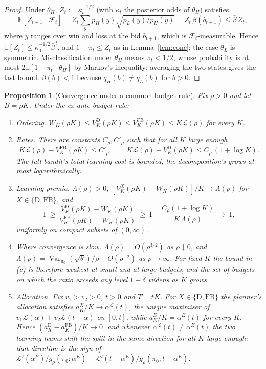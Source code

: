 \documentclass[11pt]{article}
\newtheorem{proposition}{Proposition}
\theoremstyle{definition}
\theoremstyle{remark}
\newcommand{\E}{\mathbb{E}}
\DeclareMathOperator{\Var}{Var}
\begin{document}
\begin{proof}
Under $\theta_H$, $Z_t:=\kappa_t^{-1/2}$ (with $\kappa_t$ the posterior odds of $\theta_H$) satisfies
\[
\E[Z_{t+1}\mid\mathcal F_t]=Z_t\sum_{y}p_H(y)\sqrt{p_L(y)/p_H(y)}=Z_t\,\beta(b_{t+1})\le\bar\beta\,Z_t,
\]
where $y$ ranges over win and loss at the bid $b_{t+1}$, which is $\mathcal F_t$-measurable. Hence $\E[Z_t]\le\kappa_0^{-1/2}\bar\beta^{\,t}$,
and $1-\pi_t\le Z_t$ as in Lemma~\ref{lem:conc}; the case $\theta_L$ is symmetric. Misclassification under $\theta_H$
means $\pi_t<1/2$, whose probability is at most $2\E[1-\pi_t\mid\theta_H]$ by Markov's inequality; averaging the two
states gives the last bound. $\beta(b)<1$ because $q_H(b)\neq q_L(b)$ for $b>0$.
\end{proof}

\begin{proposition}[Convergence under a common budget rule]\label{prop:common}
Fix $\rho>0$ and let $B=\rho K$. Under the ex-ante budget rule:
\begin{enumerate}
\item[(a)] \emph{Ordering.} $W_K(\rho K)\le V^{\mathrm D}_K(\rho K)\le V^{\mathrm{FB}}_K(\rho K)\le K\mathcal L(\rho)$ for every $K$.
\item[(b)] \emph{Rates.} There are constants $C_\rho,C'_\rho$ such that for all $K$ large enough
\[
K\mathcal L(\rho)-V^{\mathrm{FB}}_K(\rho K)\le C'_\rho,\qquad K\mathcal L(\rho)-V^{\mathrm D}_K(\rho K)\le C_\rho\,(1+\log K).
\]
The full bandit's total learning cost is bounded; the decomposition's grows at most logarithmically.
\item[(c)] \emph{Learning premia.} $\Lambda(\rho)>0$, $[V^{X}_K(\rho K)-W_K(\rho K)]/K\to\Lambda(\rho)$ for
$X\in\{\mathrm D,\mathrm{FB}\}$, and
\[
1\ \ge\ \frac{V^{\mathrm D}_K(\rho K)-W_K(\rho K)}{V^{\mathrm{FB}}_K(\rho K)-W_K(\rho K)}\ \ge\ 1-\frac{C_\rho(1+\log K)}{K\,\Lambda(\rho)}\ \to\ 1,
\]
uniformly on compact subsets of $(0,\infty)$.
\item[(d)] \emph{Where convergence is slow.} $\Lambda(\rho)=O(\rho^{3/2})$ as $\rho\downarrow0$, and
$\Lambda(\rho)=\Var_{\pi_0}(\sqrt\theta)/\rho+O(\rho^{-2})$ as $\rho\to\infty$. For fixed $K$ the bound in (c) is
therefore weakest at small and at large budgets, and the set of budgets on which the ratio exceeds any level
$1-\delta$ widens as $K$ grows.
\item[(e)] \emph{Allocation.} Fix $v_1>v_2>0$, $t>0$ and $T=tK$. For $X\in\{\mathrm D,\mathrm{FB}\}$ the planner's
allocation satisfies $a^X_K/K\to\alpha^{\mathcal L}(t)$, the unique maximiser of $v_1\mathcal L(\alpha)+v_2\mathcal L(t-\alpha)$
on $[0,t]$, while $a^E_K/K=\alpha^E(t)$ for every $K$. Hence $(a^{\mathrm D}_K-a^{\mathrm{FB}}_K)/K\to0$, and whenever
$\alpha^{\mathcal L}(t)\ne\alpha^E(t)$ the two learning teams shift the split in the same direction for all $K$ large
enough; that direction is the sign of $\mathcal L'(\alpha^E)/g_\rho(\pi_0;\alpha^E)-\mathcal L'(t-\alpha^E)/g_\rho(\pi_0;t-\alpha^E)$.
\end{enumerate}
\end{proposition}
\end{document}

